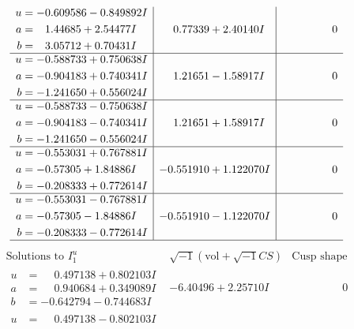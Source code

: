 \documentclass[1p]{elsarticle_modified}
\theoremstyle{definition}
\newcommand{\I}{\sqrt{-1}}
\begin{document}
$$\begin{array}{c|c|c}
\begin{aligned}
u &= -0.609586 - 0.849892 I \\
a &= \phantom{-}1.44685 + 2.54477 I \\
b &= \phantom{-}3.05712 + 0.70431 I\end{aligned}
 & \phantom{-}0.77339 + 2.40140 I & \phantom{-0.000000 } 0 \\ \hline\begin{aligned}
u &= -0.588733 + 0.750638 I \\
a &= -0.904183 + 0.740341 I \\
b &= -1.241650 + 0.556024 I\end{aligned}
 & \phantom{-}1.21651 - 1.58917 I & \phantom{-0.000000 } 0 \\ \hline\begin{aligned}
u &= -0.588733 - 0.750638 I \\
a &= -0.904183 - 0.740341 I \\
b &= -1.241650 - 0.556024 I\end{aligned}
 & \phantom{-}1.21651 + 1.58917 I & \phantom{-0.000000 } 0 \\ \hline\begin{aligned}
u &= -0.553031 + 0.767881 I \\
a &= -0.57305 + 1.84886 I \\
b &= -0.208333 + 0.772614 I\end{aligned}
 & -0.551910 + 1.122070 I & \phantom{-0.000000 } 0 \\ \hline\begin{aligned}
u &= -0.553031 - 0.767881 I \\
a &= -0.57305 - 1.84886 I \\
b &= -0.208333 - 0.772614 I\end{aligned}
 & -0.551910 - 1.122070 I & \phantom{-0.000000 } 0\\
 \hline 
 \end{array}$$\newpage$$\begin{array}{c|c|c}  
\text{Solutions to }I^u_{1}& \I (\text{vol} + \sqrt{-1}CS) & \text{Cusp shape}\\
 \hline 
\begin{aligned}
u &= \phantom{-}0.497138 + 0.802103 I \\
a &= \phantom{-}0.940684 + 0.349089 I \\
b &= -0.642794 - 0.744683 I\end{aligned}
 & -6.40496 + 2.25710 I & \phantom{-0.000000 } 0 \\ \hline\begin{aligned}
u &= \phantom{-}0.497138 - 0.802103 I \\

\end{aligned}
\end{array}$$
\end{document}
